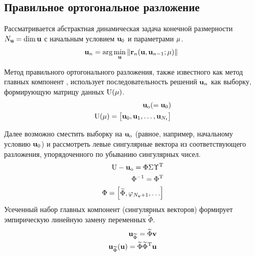 \subsection{Правильное ортогональное разложение}

Рассматривается абстрактная динамическая задача конечной размерности $N_{\mathbf{u}} = \dim \mathbf{u}$ с начальным условием $\mathbf{u}_0$ и параметрами $\mathbf{\mu}$.
\begin{equation}
    \mathbf{u}_n = \arg \min_{\mathbf{u}} \left\| \mathbf{r}_n(\mathbf{u},\mathbf{u}_{n-1};\mathbf{\mu}) \right\|_{~}
\end{equation}

Метод правильного ортогонального разложения, также известного как метод главных компонент \todo{\cite{}}, использует последовательность решений $\mathbf{u}_n$ как выборку, формирующую матрицу данных $\matr{U} (\param)$.
\begin{align}
    \unk_\text{o} (= \unk_0) \\
    \matr{U} (\param) =
    \begin{bmatrix}
        \unk_0, \unk_1, \dots, \unk_{N_t}
    \end{bmatrix}
\end{align}

Далее возможно сместить выборку на $\mathbf{u}_\text{o}$ (равное, например, начальному условию $\mathbf{u}_0$) и рассмотреть левые сингулярные вектора из соответствующего разложения, упорядоченного по убыванию сингулярных чисел.
\begin{align}
    \matr{u} - \unk_\text{o} = \Phi \Sigma \transpose{\Upsilon} \\
    \Phi^{-1} = \transpose{\Phi} \\
    \Phi = \begin{bmatrix}
        \widetilde{\Phi}, \pc[N_\vunk + 1], \dots
    \end{bmatrix}
\end{align}
Усеченный набор главных компонент (сингулярных векторов) формирует эмпирическую линейную замену переменных $\widetilde{\Phi}$.
\begin{align}
    \unk_{\widetilde{\Phi}} = \widetilde{\Phi} \vunk \\
    \unk_{\widetilde{\Phi}}(\unk) = \widetilde{\Phi} \transpose{\widetilde{\Phi}} \unk
\end{align}

